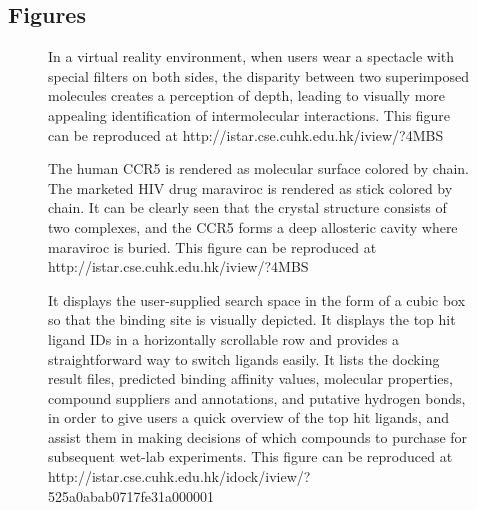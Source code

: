 \documentclass[twocolumn]{bmcart}%
\begin{document}
\begin{backmatter}

\section*{Figures}

  \begin{figure}[h!]
  \caption{
      In a virtual reality environment, when users wear a spectacle with special filters on both sides, the disparity between two superimposed molecules creates a perception of depth, leading to visually more appealing identification of intermolecular interactions. This figure can be reproduced at http://istar.cse.cuhk.edu.hk/iview/?4MBS
}\label{fig:anaglyph}
      \end{figure}

  \begin{figure}[h!]
  \caption{
      The human CCR5 is rendered as molecular surface colored by chain. The marketed HIV drug maraviroc is rendered as stick colored by chain. It can be clearly seen that the crystal structure consists of two complexes, and the CCR5 forms a deep allosteric cavity where maraviroc is buried. This figure can be reproduced at http://istar.cse.cuhk.edu.hk/iview/?4MBS}\label{fig:surface}
      \end{figure}

  \begin{figure}[h!]
  \caption{
      It displays the user-supplied search space in the form of a cubic box so that the binding site is visually depicted. It displays the top hit ligand IDs in a horizontally scrollable row and provides a straightforward way to switch ligands easily. It lists the docking result files, predicted binding affinity values, molecular properties, compound suppliers and annotations, and putative hydrogen bonds, in order to give users a quick overview of the top hit ligands, and assist them in making decisions of which compounds to purchase for subsequent wet-lab experiments. This figure can be reproduced at http://istar.cse.cuhk.edu.hk/idock/iview/?525a0abab0717fe31a000001
}\label{fig:idock}
      \end{figure}


\end{backmatter}
\end{document}
